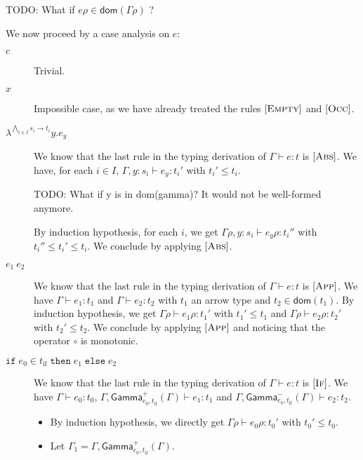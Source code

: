 \documentclass[a4paper]{article}%
\newcommand{\dom}[1]{\textsf{dom}(#1)}
\newcommand{\alt}{~|~}
\newcommand{\ite}[4]{\ensuremath{\texttt{if}\;#1\in#2\;\texttt{then}\;#3\;\texttt{else}\;#4}}
\newcommand{\tyof}[2]{\textsf{typeof}_{#2}(#1)}
\newcommand{\arrow}[2]{#1\to #2}
\newcommand{\Genv}[3]{\textsf{Gamma}^{#1}_{#2}(#3)}
\theoremstyle{definition}
\newcommand {\Rule}[1] {[\textsc{#1}]}
\begin{document}
        TODO: What if $e\rho\in\dom{\Gamma\rho}$ ? 

        We now proceed by a case analysis on $e$:
        
        \begin{description}
          \item[$c$] Trivial.
          \item[$x$] Impossible case, as we have already treated the rules $\Rule{Empty}$ and $\Rule{Occ}$.
          \item[$\lambda^{\bigwedge_{i\in I} \arrow {s_i} {t_i}}y.e_y$]
          We know that the last rule in the typing derivation of $\Gamma \vdash e:t$ is $\Rule {Abs}$.
          We have, for each $i \in I$, $\Gamma,y:s_i \vdash e_y:t_i'$ with $t_i'\leq t_i$.
          
          TODO: What if y is in dom(gamma)? It would not be well-formed anymore.

          By induction hypothesis, for each $i$, we get  $\Gamma\rho,y:s_i \vdash e_y\rho:t_i''$ with $t_i''\leq t_i'\leq t_i$. We conclude by applying $\Rule {Abs}$.
          \item[$e_1\ e_2$] We know that the last rule in the typing derivation of $\Gamma \vdash e:t$ is $\Rule {App}$.
          We have $\Gamma\vdash e_1:t_1$ and $\Gamma\vdash e_2:t_2$ with $t_1$ an arrow type and $t_2 \in \dom {t_1}$.
          By induction hypothesis, we get $\Gamma\rho\vdash e_1\rho:t_1'$ with $t_1' \leq t_1$ and $\Gamma\rho\vdash e_2\rho:t_2'$ with $t_2' \leq t_2$.
          We conclude by applying $\Rule {App}$ and noticing that the operator $\circ$ is monotonic.
          \item[$\ite {e_0} {t_{\text{if}}} {e_1}{e_2}$] We know that the last rule in the typing derivation of $\Gamma \vdash e:t$ is $\Rule {If}$.
          We have $\Gamma\vdash e_0:t_0$, $\Gamma,\Genv + {e_0,t_{\text{if}}} \Gamma\vdash e_1 : t_1$ and $\Gamma,\Genv - {e_0,t_{\text{if}}} \Gamma\vdash e_2 : t_2$.
          \begin{itemize}
            \item By induction hypothesis, we directly get $\Gamma\rho\vdash e_0\rho:t_0'$ with $t_0'\leq t_0$.
            \item Let $\Gamma_1 = \Gamma,\Genv + {e_0,t_{\text{if}}} \Gamma$.
            

\end{itemize}
\end{description}
\end{document}
